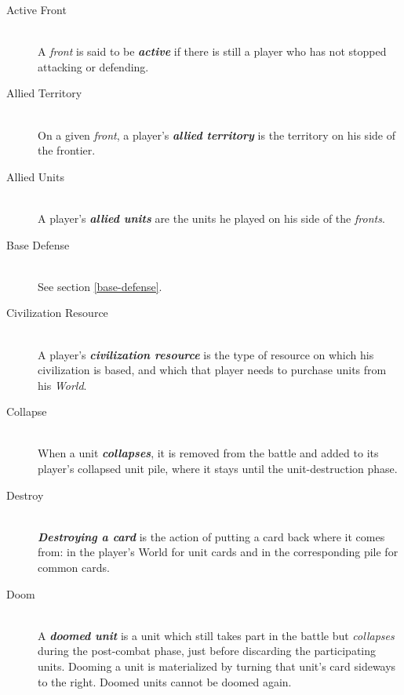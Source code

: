 \documentclass[a4paper]{article}
\begin{document}
    \begin{description}
        \item[Active Front] \hfill \\
            A \textit{front} is said to be \textbf{\textit{active}} if there is still a player
            who has not stopped attacking or defending.
            
        \item[Allied Territory] \hfill \\
            On a given \textit{front}, a player's \textbf{\textit{allied territory}}
            is the territory on his side of the frontier.
            
        \item[Allied Units] \hfill \\
            A player's \textbf{\textit{allied units}} are the units he played on his side
            of the \textit{fronts}.
            
        \item[Base Defense] \hfill \\
            See section \ref{base-defense}.
            
        \item[Civilization Resource] \hfill \\
            A player's \textbf{\textit{civilization resource}} is the type of resource
            on which his civilization is based, and which that player needs to purchase
            units from his \textit{World}.
            
        \item[Collapse] \hfill \\
            When a unit \textbf{\textit{collapses}},
            it is removed from the battle and added to its player's collapsed unit pile,
            where it stays until the unit-destruction phase.
            
        \item[Destroy] \hfill \\
            \textbf{\textit{Destroying a card}} is the action of putting a card back
            where it comes from: in the player's World for unit cards and
            in the corresponding pile for common cards.
            
        \item[Doom] \hfill \\
            A \textbf{\textit{doomed unit}} is a unit which still takes part in the
            battle but \textit{collapses} during the post-combat
            phase, just before discarding the participating units.
            Dooming a unit is materialized by turning that unit's card
            sideways to the right.
            Doomed units cannot be doomed again.
            

\end{description}
\end{document}
